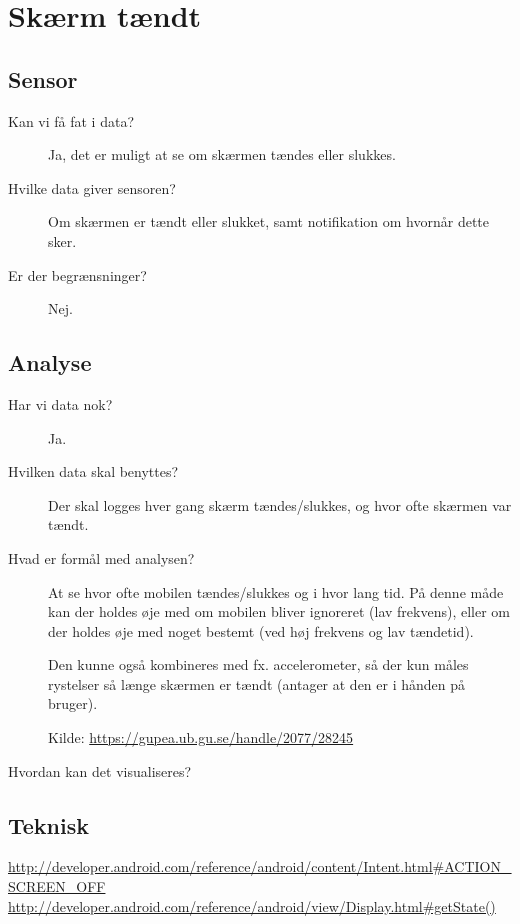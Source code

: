 \section{Skærm tændt}

\subsection{Sensor}

\begin{description}
\item[Kan vi få fat i data?]
Ja, det er muligt at se om skærmen tændes eller slukkes.

\item[Hvilke data giver sensoren?]
Om skærmen er tændt eller slukket, samt notifikation om hvornår dette sker.

\item[Er der begrænsninger?]
Nej.

\end{description}

\subsection{Analyse}
\begin{description}
\item[Har vi data nok?]
Ja.

\item[Hvilken data skal benyttes?]
Der skal logges hver gang skærm tændes/slukkes, og hvor ofte skærmen var tændt.

\item[Hvad er formål med analysen?]
At se hvor ofte mobilen tændes/slukkes og i hvor lang tid.
På denne måde kan der holdes øje med om mobilen bliver ignoreret (lav frekvens), eller om der holdes øje med noget bestemt (ved høj frekvens og lav tændetid).

Den kunne også kombineres med fx. accelerometer, så der kun måles rystelser så længe skærmen er tændt (antager at den er i hånden på bruger).

Kilde: \url{https://gupea.ub.gu.se/handle/2077/28245}

\item[Hvordan kan det visualiseres?]

\end{description}

\subsection{Teknisk}
\url{http://developer.android.com/reference/android/content/Intent.html#ACTION_SCREEN_OFF}\\
\url{http://developer.android.com/reference/android/view/Display.html#getState()}
